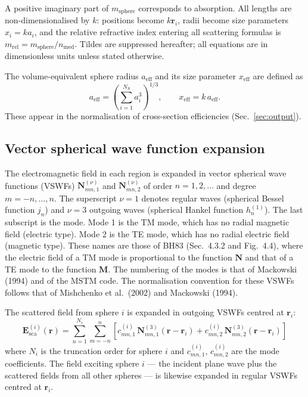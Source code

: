 \documentclass[11pt,a4paper]{article}
\begin{document}
A positive imaginary part of $m_\mathrm{sphere}$ corresponds to absorption.
All lengths are non-dimensionalised by $k$: positions become $k\bm{r}_i$, radii become size parameters $x_i = k a_i$, and the relative refractive index entering all scattering formulas is $m_\mathrm{rel} = m_\mathrm{sphere} / n_\mathrm{med}$.
Tildes are suppressed hereafter; all equations are in dimensionless units unless stated otherwise.

The volume-equivalent sphere radius $a_\mathrm{eff}$ and its size parameter $x_\mathrm{eff}$ are defined as
\begin{equation}
  a_\mathrm{eff} = \left(\sum_{i=1}^{N_S} a_i^3\right)^{\!1/3}, \qquad
  x_\mathrm{eff} = k\,a_\mathrm{eff}.
  \label{eq:a-eff}
\end{equation}
These appear in the normalisation of cross-section efficiencies (Sec.~\ref{sec:output}).

\subsection{Vector spherical wave function expansion}
\label{sec:vswf}

The electromagnetic field in each region is expanded in vector spherical wave functions (VSWFs) $\bm{N}_{mn,1}^{(\nu)}$ and $\bm{N}_{mn,2}^{(\nu)}$ of order $n = 1, 2, \dots$ and degree $m = -n, \dots, n$.
The superscript $\nu = 1$ denotes regular waves (spherical Bessel function $j_n$) and $\nu = 3$ outgoing waves (spherical Hankel function $h_n^{(1)}$).
The last subscript is the mode.
Mode 1 is the TM mode, which has no radial magnetic field (electric type).
Mode 2 is the TE mode, which has no radial electric field (magnetic type).
These names are those of BH83 (Sec.~4.3.2 and Fig.~4.4), where the electric field of a TM mode is proportional to the function $\bm{N}$ and that of a TE mode to the function $\bm{M}$.
The numbering of the modes is that of Mackowski (1994) and of the MSTM code.
The normalisation convention for these VSWFs follows that of Mishchenko et al.\ (2002) and Mackowski (1994).

The scattered field from sphere $i$ is expanded in outgoing VSWFs centred at $\bm{r}_i$:
\begin{equation}
  \bm{E}_\mathrm{sca}^{(i)}(\bm{r}) = \sum_{n=1}^{N_i} \sum_{m=-n}^{n}
  \left[ c_{mn,1}^{(i)}\,\bm{N}_{mn,1}^{(3)}(\bm{r} - \bm{r}_i)
       + c_{mn,2}^{(i)}\,\bm{N}_{mn,2}^{(3)}(\bm{r} - \bm{r}_i) \right]
  \label{eq:sca-expansion}
\end{equation}
where $N_i$ is the truncation order for sphere $i$ and $c_{mn,1}^{(i)}$, $c_{mn,2}^{(i)}$ are the mode coefficients.
The field exciting sphere $i$ --- the incident plane wave plus the scattered fields from all other spheres --- is likewise expanded in regular VSWFs centred at $\bm{r}_i$.
\end{document}
